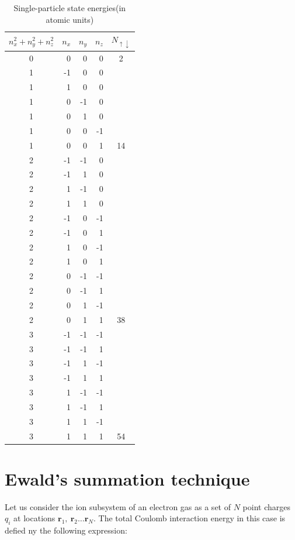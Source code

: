 \documentclass[twoside,english]{uiofysmaster}
\begin{document}
\begin{table}[!ht]
	\begin{center}
\begin{tabular}{ c | r | r | r | c} 
	$n_x^2+n_y^2+n_z^2$& $n_x$ & $n_y$ & $n_z$ & $N_{\uparrow \downarrow}$ \\
	\hline
	\hline
	0& 0  & 0  & 0  & 2 \\ 
	1& -1 & 0  & 0  &  \\ 
	1& 1  & 0  & 0  &  \\ 
	1& 0  & -1 & 0  &  \\ 
	1& 0  & 1  & 0  &  \\ 
	1& 0  & 0  & -1 &  \\ 
	1& 0  & 0  & 1  & 14 \\ 
	2& -1 & -1 & 0  &  \\ 
	2& -1 & 1  & 0  &  \\ 
	2& 1  & -1 & 0  &  \\ 
	2& 1  & 1  & 0  &  \\ 
	2& -1 & 0  & -1 &  \\ 
	2& -1 & 0  & 1  &  \\ 
	2& 1  & 0  & -1 &  \\ 
	2& 1  & 0  & 1  &  \\ 
	2& 0  & -1 & -1 &  \\ 
	2& 0  & -1 & 1  &  \\ 
	2& 0  & 1  & -1 &  \\ 
	2& 0  & 1  & 1  & 38 \\ 
	3& -1 & -1 & -1 &  \\ 
	3& -1 & -1 & 1  &  \\ 
	3& -1 & 1  & -1 &  \\ 
	3&  -1& 1  & 1  &  \\ 
	3& 1  & -1 & -1 &  \\ 
	3& 1  & -1 & 1  &  \\ 
	3& 1  & 1  & -1 &  \\ 
	3& 1  & 1  & 1  & 54 \\ 
\end{tabular} 
\caption{Single-particle state energies(in atomic units)}
\label{tab:spnumbers}
\end{center}
\end{table}


\section{Ewald's summation technique}

Let us consider the ion subsystem of an electron gas as a set of $N$ point charges $q_i$ at locations $\mathbf{r}_1,\ \mathbf{r}_2\dots \mathbf{r}_N$. The total Coulomb interaction energy in this case is defied ny the following expression:
\end{document}
